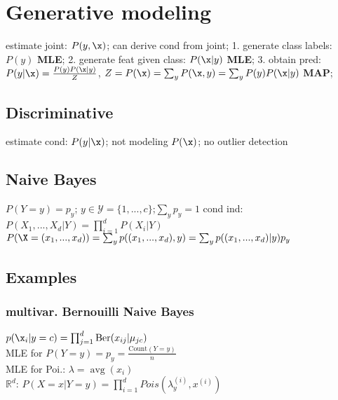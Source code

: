 \section*{Generative modeling}
estimate joint: $P(y,\x)$; can derive cond from joint;
1. generate class labels: $P{(y)}$ \textbf{MLE};
2. generate feat given class: $P(\x|y)$ \textbf{MLE};
3. obtain pred: $P(y|\x)=\frac{P(y)P(\x|y)}{Z}$,
$Z=P(\x)=\sum_yP(\x,y)=\sum_yP(y)P(\x|y)$ \textbf{MAP};
\subsection*{Discriminative}
estimate cond: $P(y|\x)$; not modeling $P(\x)$;
no outlier detection

\subsection*{Naive Bayes}
$P(Y=y)=p_y$; $y\in\mathcal{Y}=\{1,...,c\}$;$\sum_yp_y=1$
cond ind:
$P(X_1,...,X_d|Y)=\prod_{i=1}^dP(X_i|Y)$\\
$P(\X=(x_1,...,x_d))=\sum_yp((x_1,...,x_d),y)=\sum_yp((x_1,...,x_d)|y)p_y$


\subsection*{Examples}
\subsubsection*{multivar. Bernouilli Naive Bayes}
$p(\x_i|y=c)=\prod_{j=1}^d\text{Ber}(x_{ij}|\mu_{jc})$\\
MLE for $P(Y=y) = p_y = \frac{\text{Count}(Y=y)}{n}$\\
MLE for Poi.: $\lambda = \operatorname{avg}(x_i) $\\
$\mathbb{R}^d$: $P(X = x|Y = y) = \prod_{i=1}^dPois(\lambda_y^{(i)},x^{(i)})$


